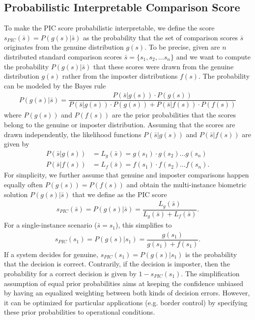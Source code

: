 \documentclass[10pt,twocolumn,letterpaper]{article}
\begin{document}
\subsection{Probabilistic Interpretable Comparison Score}
\label{sec:Methodolgy-PIC}
To make the PIC score probabilistic interpretable, we define the score $s_{PIC}(\bar{s}) = P(g(s)|\bar{s})$ as the probability that the set of comparison scores $\bar{s}$ originates from the genuine distribution $g(s)$.
To be precise, given are $n$ distributed standard comparison scores $\bar{s}=\{s_1, s_2, \dots s_n\}$ and we want to compute the probability $P(g(s)|\bar{s})$ that these scores were drawn from the genuine distribution $g(s)$ rather from the imposter distributions $f(s)$.
The probability can be modeled by the Bayes rule
\begin{align}
    P(g(s)|\bar{s}) = \dfrac{P(\bar{s}|g(s)) \cdot P(g(s))}{P(\bar{s}|g(s)) \cdot P(g(s)) + P(\bar{s}|f(s)) \cdot P(f(s))}
\end{align} 
where $P(g(s))$ and $P(f(s))$ are the prior probabilities that the scores belong to the genuine or imposter distribution.
Assuming that the scores are drawn independently, the likelihood functions $P(\bar{s}|g(s))$ and $P(\bar{s}|f(s))$ are given by
\begin{align}
    P(\bar{s}|g(s)) &= L_g(\bar{s}) = g(s_1) \cdot g(s_2)  \dots g(s_n) \\
    P(\bar{s}|f(s)) &= L_f(\bar{s}) = f(s_1) \cdot f(s_2)  \dots f(s_n).
\end{align}
For simplicity, we further assume that genuine and imposter comparisons happen equally often $P(g(s))=P(f(s))$ and obtain the multi-instance biometric solution $P(g(s)|\bar{s})$ that we define as the PIC score
\begin{align}
    s_{PIC}(\bar{s}) = P(g(s)|\bar{s}) = \dfrac{L_g(\bar{s})}{L_g(\bar{s}) + L_f(\bar{s})}. \label{eq:SimplifiedEquation}
\end{align}
For a single-instance scenario ($\bar{s} = s_1$), this simplifies to
\begin{align}
     s_{PIC}(s_1) = P(g(s)|s_1) = \dfrac{g(s_1)}{g(s_1) + f(s_1)}.
\end{align}
If a system decides for genuine, $s_{PIC}(s_1) = P(g(s)|s_1)$ is the probability that the decision is correct.
Contrarily, if the decision is imposter, then the probability for a correct decision is given by $1-s_{PIC}(s_1)$. 
{The simplification assumption of equal prior probabilities aims at keeping the confidence unbiased by having an equalized weighting between both kinds of decision errors.
However, it can be optimized for particular applications (e.g. border control) by specifying these prior probabilities to operational conditions.}
\end{document}
